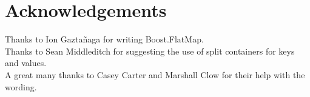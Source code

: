 \section{Acknowledgements}

Thanks to Ion Gazta\~{n}aga for writing Boost.FlatMap.\\

Thanks to Sean Middleditch for suggesting the use of split containers for keys
and values.\\

A great many thanks to Casey Carter and Marshall Clow for their help with the wording.
